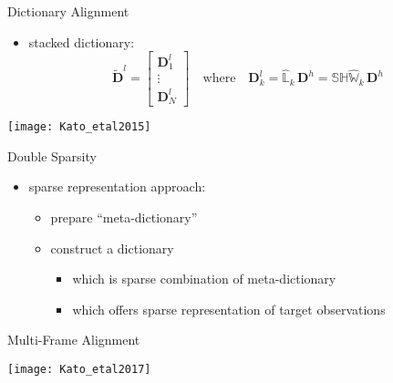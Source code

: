 \documentclass[fleqn,aspectratio=1610]{beamer}
\begin{document}
\begin{frame}[label={sec:orgf9618fc}]{Dictionary Alignment}
\begin{itemize}
\item stacked dictionary:
\begin{equation}
  \tilde{\mathbf{D}}^{l}
  =
  \begin{bmatrix}
    \mathbf{D}^{l}_{1}\\\vdots\\\mathbf{D}^{l}_{N}
  \end{bmatrix}
  \quad\text{where}\quad
  \mathbf{D}^{l}_{k}
  =\hat{\mathbb{L}}_k\,\mathbf{D}^{h}
  =\mathbb{SH}\hat{\mathbb{W}}_{k}\,\mathbf{D}^{h}
\end{equation}
\end{itemize}
\begin{center}
\texttt{[image: Kato\_etal2015]}
\end{center}
\end{frame}

\begin{frame}[label={sec:orge954e03}]{Double Sparsity}
\begin{itemize}
\item sparse representation approach:
\parencite{KatoHinoMurata2017}
\begin{itemize}
\item prepare ``meta-dictionary''
\item construct a dictionary 
\begin{itemize}
\item which is sparse combination of meta-dictionary
\item which offers sparse representation of target observations
\end{itemize}
\parencite{RubinsteinZibulevskyElad2010}
\end{itemize}
\end{itemize}
\end{frame}

\begin{frame}[label={sec:orgd04377e}]{Multi-Frame Alignment}
\begin{center}
\texttt{[image: Kato\_etal2017]}
\end{center}
\end{frame}
\end{document}
